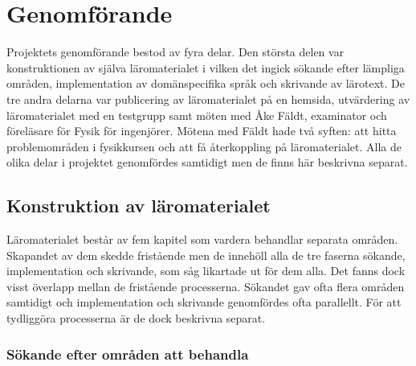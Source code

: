 



\chapter{Genomförande}

Projektets genomförande bestod av fyra delar. Den största delen var
konstruktionen av själva läromaterialet i vilken det ingick sökande efter lämpliga
områden, implementation av domänspecifika språk och skrivande av lärotext. De
tre andra delarna var publicering av läromaterialet på en hemsida, utvärdering
av läromaterialet med en testgrupp samt möten med Åke Fäldt, examinator och
föreläsare för Fysik för ingenjörer. Mötena med Fäldt hade två syften: att hitta
problemområden i fysikkursen och att få återkoppling på läromaterialet. Alla de olika delar i projektet genomfördes samtidigt men de finns här beskrivna separat.

\section{Konstruktion av läromaterialet}\label{sec:konstruktion}

Läromaterialet består av fem kapitel som vardera behandlar separata områden. Skapandet av dem skedde fristående men de innehöll alla de tre faserna sökande, implementation och skrivande, som såg likartade ut för dem alla. Det fanns dock visst överlapp mellan de fristående processerna. Sökandet gav ofta flera områden samtidigt och implementation och skrivande genomfördes ofta parallellt. För att tydliggöra processerna är de dock beskrivna separat.

\subsection{Sökande efter områden att behandla}\label{sec:valet}

